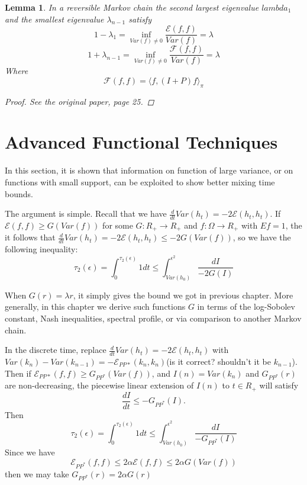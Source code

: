 \documentclass[12pt,reqno]{amsart}
\newtheorem{lem}[thm]{Lemma}
\begin{document}
\begin{lem}
  In a reversible Markov chain the second largest eigenvalue $lambda_1$ and the smallest 
eigenvalue $\lambda_{n-1}$ satisfy
\begin{equation}
  1 - \lambda_1 = \inf_{Var(f)\neq 0}\frac{\mathcal{E}(f,f)}{Var(f)} = \lambda
\end{equation}
\begin{equation}
  1 + \lambda_{n-1} = \inf_{Var(f)\neq 0}\frac{\mathcal{F}(f,f)}{Var(f)} = \lambda
\end{equation}
Where 
$$\mathcal{F}(f,f) = \langle f,(I+P)f\rangle_{\pi}$$
\begin{proof}
  See the original paper, page 25.
\end{proof}
\end{lem}

\section{Advanced Functional Techniques}
In this section, it is shown that information on function of large variance, or on functions with small support, can be exploited to show better mixing time bounds.

The argument is simple. Recall that we have $\frac{d}{dt}Var(h_t)=-2\mathcal{E}(h_t,h_t)$. If 
$\mathcal{E}(f,f)\geq G(Var(f))$ for some $G : R_+\rightarrow R_+$ and $f : \Omega \rightarrow R_+$ with $Ef=1$, the it follows that $\frac{d}{dt}Var(h_t)=-2\mathcal{E}(h_t,h_t)\leq -2 G(Var(f)) $, so we have the following inequality:
\begin{equation}
  \label{eq:inte_ineq}
  \tau_2(\epsilon) = \int_0^{\tau_2(\epsilon)}1dt \leq \int_{Var(h_0)}^{\epsilon^2}\frac{dI}{-2G(I)}
\end{equation}

When $G(r) = \lambda r$, it simply gives the bound we got in previous chapter. More generally, in this chapter we derive such functions $G$ in terms of the log-Sobolev constant, Nash inequalities, spectral profile, or via comparison to another Markov chain.

In the discrete time, replace  $\frac{d}{dt}Var(h_t)=-2\mathcal{E}(h_t,h_t)$ with $Var(k_n)-Var(k_{n-1}) = -\mathcal{E}_{PP*}(k_n,k_n)$(\tiny is it correct? shouldn't it be $k_{n-1}$)\normalsize.
Then if $\mathcal{E}_{PP*}(f,f)\geq G_{PP^*}(Var(f))$, and $I(n)=Var(k_n)$ and $G_{PP^*}(r)$ are non-decreasing, the piecewise linear extension of $I(n)$ to $t\in R_+$ will satisfy
\begin{equation}
  \label{eq:discrete_ineq}
  \frac{dI}{dt}\leq -G_{PP^*}(I).
\end{equation}
Then
\begin{equation}
 \tau_2(\epsilon) = \int_0^{\tau_2(\epsilon)}1dt \leq \int_{Var(h_0)}^{\epsilon^2}\frac{dI}{-G_{PP^*}(I)} 
\end{equation}
Since we have 
$$\mathcal{E}_{PP^*}(f,f)\leq 2\alpha\mathcal{E}(f,f) \leq 2\alpha G(Var(f)) 
$$
then we may take $G_{PP^*}(r)=2\alpha G(r)$
\end{document}
